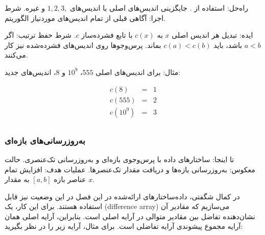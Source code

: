 راه‌حل: استفاده از .
جایگزینی اندیس‌های اصلی با اندیس‌های $1,2,3,$ و غیره.
شرط اجرا: آگاهی قبلی از تمام اندیس‌های موردنیاز الگوریتم.

ایده: تبدیل هر اندیس اصلی $x$ به $c(x)$ با تابع فشرده‌ساز $c$.
شرط حفظ ترتیب: اگر $a<b$ باشد، باید $c(a)<c(b)$ بماند.
پرس‌وجوها روی اندیس‌های فشرده‌شده نیز کار می‌کنند.

مثال: برای اندیس‌های اصلی $555$، $10^9$ و $8$، اندیس‌های جدید:

\[
\begin{array}{lcl}
c(8) & = & 1 \\
c(555) & = & 2 \\
c(10^9) & = & 3 \\
\end{array}
\]

\subsubsection{به‌روزرسانی‌های بازه‌ای}

تا اینجا: ساختارهای داده با پرس‌وجوی بازه‌ای و به‌روزرسانی تک‌عنصری.
حالت معکوس: به‌روزرسانی بازه‌ها و دریافت مقدار تک‌عنصرها.
عملیات هدف: افزایش تمام عناصر بازه $[a,b]$ به مقدار $x$.


در کمال شگفتی، داده‌ساختارهای ارائه‌شده در این فصل در این وضعیت نیز قابل استفاده هستند. برای این کار، یک  (difference array) می‌سازیم که مقادیر آن نشان‌دهنده تفاضل بین مقادیر متوالی در آرایه اصلی است. بنابراین، آرایه اصلی همان آرایه مجموع پیشوندی آرایه تفاضلی است. برای مثال، آرایه زیر را در نظر بگیرید:

\begin{center}
\end{center}

